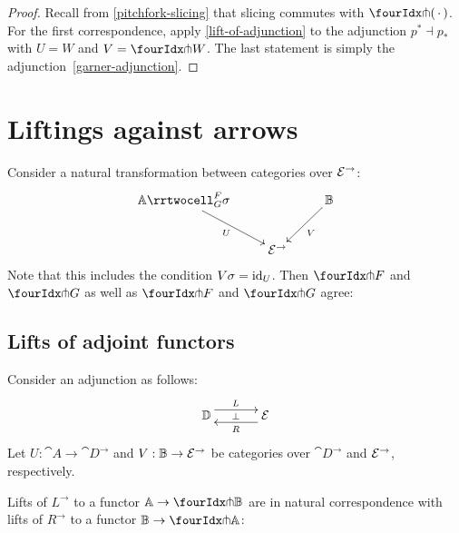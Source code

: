 \documentclass[reqno,10pt,a4paper,oneside]{amsart}
\begin{document}
\begin{proof}
Recall from \cref{pitchfork-slicing} that slicing commutes with $\liftr{\brarghole}$.
For the first correspondence, apply \cref{lift-of-adjunction} to the adjunction $p^* \dashv p_*$ with $U = W$ and $V = \liftr{W}$.
The last statement is simply the adjunction~\eqref{garner-adjunction}.
\end{proof}

\newpage

\appendix

\section{Liftings against arrows} 

\begin{lemma}
Consider a natural transformation between categories over $\mathcal{E}^{\to}$:
\[
\xymatrix{
  \cat{A}
  \rrtwocell_G^F{\sigma}
 \ar[dr]_{U}
&&
  \cat{B}
  \ar[dl]^{V}
\\&
  \catE^{\to}
}
\]
Note that this includes the condition $V \sigma = \operatorname{id}_U$.
Then $\liftr{F}$ and $\liftr{G}$ as well as $\liftl{F}$ and $\liftl{G}$ agree:
\end{lemma}

\subsection{Lifts of adjoint functors}

Consider an adjunction as follows:
\[
\xymatrix@C+1em{
  \cat{D}
  \ar@<5pt>[r]^{L}
  \ar@{}[r]|{\bot}
&
  \catE
  \ar@<5pt>[l]^{R}
}
\]
Let $U : \cat{A} \to \cat{D}^{\to}$ and $V : \mathbb{B} \to \mathcal{E}^{\to}$ be categories over $\cat{D}^{\to}$ and $\mathcal{E}^{\to}$, respectively.

\begin{lemma}
\label{lift-of-adjunction}
Lifts of $L^{\to}$ to a functor $\cat{A} \to \liftl{\cat{B}}$ are in natural correspondence with lifts of $R^{\to}$ to a functor $\cat{B} \to \liftr{\cat{A}}$:
\end{lemma}
\end{document}

